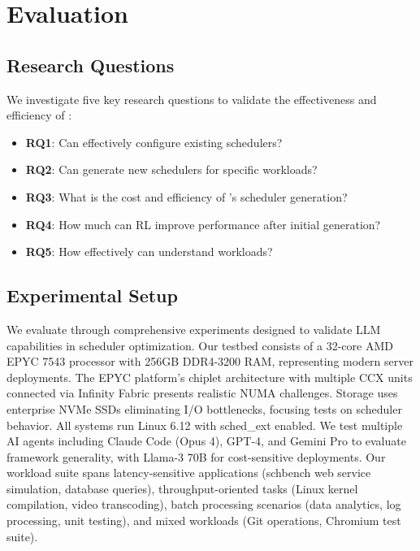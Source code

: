 \section{Evaluation}

\subsection{Research Questions}

We investigate five key research questions to validate the effectiveness and efficiency of \sys:

\begin{itemize}
\item \textbf{RQ1}: Can \sys effectively configure existing schedulers?
\item \textbf{RQ2}: Can \sys generate new schedulers for specific workloads?
\item \textbf{RQ3}: What is the cost and efficiency of \sys's scheduler generation?
\item \textbf{RQ4}: How much can RL improve performance after initial generation?
\item \textbf{RQ5}: How effectively can \sys understand workloads?
\end{itemize}

\subsection{Experimental Setup}

We evaluate \sys through comprehensive experiments designed to validate LLM capabilities in scheduler optimization. Our testbed consists of a 32-core AMD EPYC 7543 processor with 256GB DDR4-3200 RAM, representing modern server deployments. The EPYC platform's chiplet architecture with multiple CCX units connected via Infinity Fabric presents realistic NUMA challenges. Storage uses enterprise NVMe SSDs eliminating I/O bottlenecks, focusing tests on scheduler behavior. All systems run Linux 6.12 with sched\_ext enabled. We test multiple AI agents including Claude Code (Opus 4), GPT-4, and Gemini Pro to evaluate framework generality, with Llama-3 70B for cost-sensitive deployments. Our workload suite spans latency-sensitive applications (schbench web service simulation, database queries), throughput-oriented tasks (Linux kernel compilation, video transcoding), batch processing scenarios (data analytics, log processing, unit testing), and mixed workloads (Git operations, Chromium test suite).

